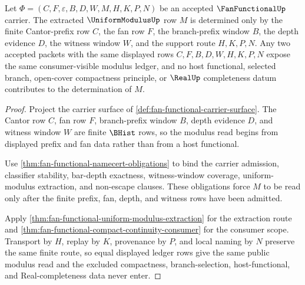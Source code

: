 \begin{theorem}
\label{thm:fan-functional-cantor-modulus-ledger}
Let $\Phi=(C,F,\varepsilon,B,D,W,M,H,K,P,N)$ be an accepted $\FanFunctionalUp$ carrier. The extracted $\UniformModulusUp$ row $M$ is determined only by the finite Cantor-prefix row $C$, the fan row $F$, the branch-prefix window $B$, the depth evidence $D$, the witness window $W$, and the support route $H,K,P,N$. Any two accepted packets with the same displayed rows $C,F,B,D,W,H,K,P,N$ expose the same consumer-visible modulus ledger, and no host functional, selected branch, open-cover compactness principle, or $\RealUp$ completeness datum contributes to the determination of $M$.
\end{theorem}
\begin{proof}
Project the carrier surface of \autoref{def:fan-functional-carrier-surface}. The Cantor row $C$, fan row $F$, branch-prefix window $B$, depth evidence $D$, and witness window $W$ are finite $\BHist$ rows, so the modulus read begins from displayed prefix and fan data rather than from a host functional.

Use \autoref{thm:fan-functional-namecert-obligations} to bind the carrier admission, classifier stability, bar-depth exactness, witness-window coverage, uniform-modulus extraction, and non-escape clauses. These obligations force $M$ to be read only after the finite prefix, fan, depth, and witness rows have been admitted.

Apply \autoref{thm:fan-functional-uniform-modulus-extraction} for the extraction route and \autoref{thm:fan-functional-compact-continuity-consumer} for the consumer scope. Transport by $H$, replay by $K$, provenance by $P$, and local naming by $N$ preserve the same finite route, so equal displayed ledger rows give the same public modulus read and the excluded compactness, branch-selection, host-functional, and Real-completeness data never enter.
\end{proof}

